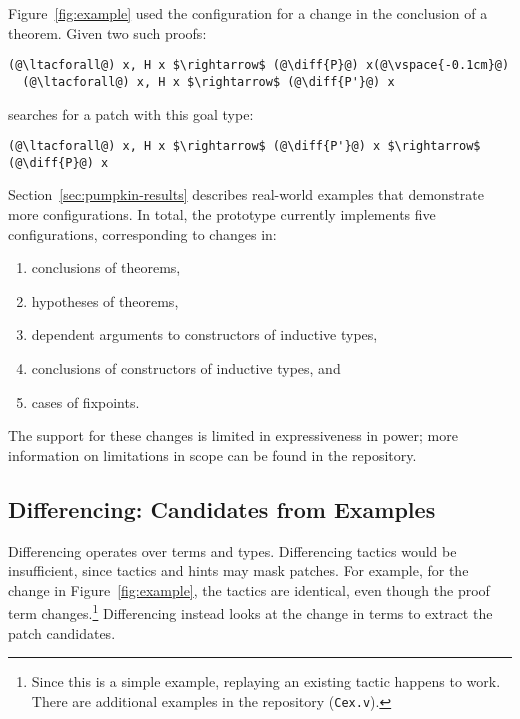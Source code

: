 Figure~\ref{fig:example} used the configuration for a change in the conclusion of a theorem.
Given two such proofs:

\begin{lstlisting}[language=coq]
  (@\ltacforall@) x, H x $\rightarrow$ (@\diff{P}@) x(@\vspace{-0.1cm}@)
  (@\ltacforall@) x, H x $\rightarrow$ (@\diff{P'}@) x
\end{lstlisting}
\sysname searches for a patch with this goal type:

\begin{lstlisting}[language=coq]
  (@\ltacforall@) x, H x $\rightarrow$ (@\diff{P'}@) x $\rightarrow$ (@\diff{P}@) x
\end{lstlisting}

Section~\ref{sec:pumpkin-results} describes real-world examples that demonstrate more configurations.
In total, the \sysname prototype currently implements five configurations, corresponding to changes in:

\begin{enumerate}
\item conclusions of theorems,
\item hypotheses of theorems,
\item dependent arguments to constructors of inductive types, 
\item conclusions of constructors of inductive types, and
\item cases of fixpoints.
\end{enumerate}
The support for these changes is limited in expressiveness in power;
more information on limitations in scope can be found in the repository. %

\subsection{Differencing: Candidates from Examples}
\label{sec:pumpkin-spec-diff}

Differencing operates over terms and types. Differencing tactics
would be insufficient, since tactics and hints may mask patches.
For example, for the change in Figure~\ref{fig:example},
the tactics are identical, even though the proof term changes.\footnote{Since this is a simple example, replaying an existing tactic happens to work. There
are additional examples in the repository (\lstinline{Cex.v}).} %
Differencing instead looks at the change in terms to extract the patch candidates.

